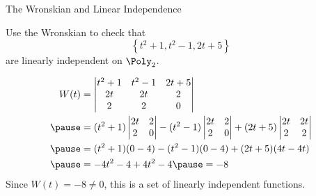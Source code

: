 \documentclass{beamer}
\begin{document}
\begin{frame}{The Wronskian and Linear Independence}
\begin{example}
Use the Wronskian to check that
\begin{equation*}
\left\{t^2+1, t^2-1, 2t+5\right\}
\end{equation*}
are linearly independent on $\Poly_2$.\pause

\begin{equation*}
\begin{aligned}
W(t)&=
\begin{vmatrix}
t^2+1 & t^2-1 & 2t+5 \\
2t    & 2t    & 2    \\
2     & 2     & 0    \\
\end{vmatrix}\\\pause
&=(t^2+1)
\begin{vmatrix}
2t & 2 \\
2  & 0 \\
\end{vmatrix}
-(t^2-1)
\begin{vmatrix}
2t & 2 \\
2  & 0 \\
\end{vmatrix}
+(2t+5)
\begin{vmatrix}
2t & 2t \\
2  & 2  \\
\end{vmatrix}\\\pause
&=(t^2+1)(0-4)-(t^2-1)(0-4)+(2t+5)(4t-4t)\\\pause
&=-4t^2-4+4t^2-4\pause = -8
\end{aligned}
\end{equation*}
Since $W(t)=-8\neq 0$, this is a set of linearly independent functions.
\end{example}
\end{frame}
\end{document}

